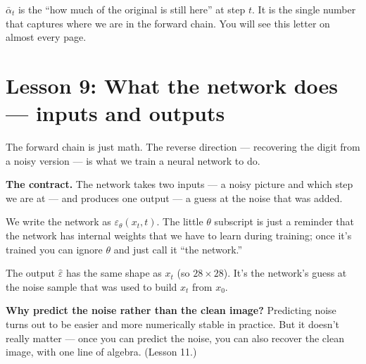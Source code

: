 \documentclass[11pt]{article}
\begin{document}
\begin{intuition}
$\bar\alpha_t$ is the ``how much of the original is still here'' at
step $t$. It is the single number that captures where we are in the
forward chain. You will see this letter on almost every page.
\end{intuition}

\section{Lesson 9: What the network does --- inputs and outputs}

The forward chain is just math. The reverse direction --- recovering
the digit from a noisy version --- is what we train a neural network to
do.

\textbf{The contract.} The network takes two inputs --- a noisy picture
and which step we are at --- and produces one output --- a guess at the
noise that was added.

\begin{center}
\end{center}

We write the network as $\varepsilon_\theta(x_t, t)$. The little
$\theta$ subscript is just a reminder that the network has internal
weights that we have to learn during training; once it's trained you
can ignore $\theta$ and just call it ``the network.''

The output $\hat\varepsilon$ has the same shape as $x_t$ (so $28\times
28$). It's the network's guess at the noise sample that was used to
build $x_t$ from $x_0$.

\textbf{Why predict the noise rather than the clean image?} Predicting
noise turns out to be easier and more numerically stable in practice.
But it doesn't really matter --- once you can predict the noise, you
can also recover the clean image, with one line of algebra. (Lesson
11.)
\end{document}
